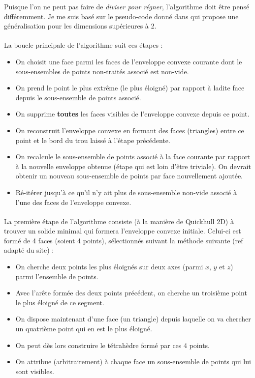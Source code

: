 \documentclass[]{article}
\begin{document}
Puisque l'on ne peut pas faire de \emph{diviser pour régner}, l'algorithme doit être pensé différemment. Je me suis basé sur le pseudo-code donné dans \cite{10.1145/235815.235821} qui propose une généralisation pour les dimensions supérieures à 2.

\paragraph{}
La boucle principale de l'algorithme suit ces étapes :
\begin{itemize}
	\item On choisit une face parmi les faces de l'enveloppe convexe courante dont le sous-ensembles de points non-traités associé est non-vide.
	\item On prend le point le plus extrême (le plus éloigné) par rapport à ladite face depuis le sous-ensemble de points associé.
	\item On supprime \textbf{toutes} les faces visibles de l'enveloppe convexe depuis ce point.
	\item On reconstruit l'enveloppe convexe en formant des faces (triangles) entre ce point et le bord du trou laissé à l'étape précédente.
	\item On recalcule le sous-ensemble de points associé à la face courante par rapport à la nouvelle enveloppe obtenue (étape qui est loin d'être triviale). On devrait obtenir un nouveau sous-ensemble de points par face nouvellement ajoutée.
	\item Ré-itérer jusqu'à ce qu'il n'y ait plus de sous-ensemble non-vide associé à l'une des faces de l'enveloppe convexe.
\end{itemize}

\paragraph{}
La première étape de l'algorithme consiste (à la manière de Quickhull 2D) à trouver un solide minimal qui formera l'enveloppe convexe initiale. Celui-ci est formé de 4 faces (soient 4 points), sélectionnés suivant la méthode suivante (ref adapté du site) :
\begin{itemize}
	\item On cherche deux points les plus éloignés sur deux axes (parmi $x$, $y$ et $z$) parmi l'ensemble de points.
	\item Avec l'arête formée des deux points précédent, on cherche un troisième point le plus éloigné de ce segment.
	\item On dispose maintenant d'une face (un triangle) depuis laquelle on va chercher un quatrième point qui en est le plus éloigné.
	\item On peut dès lors construire le tétrahèdre formé par ces 4 points.
	\item On attribue (arbitrairement) à chaque face un sous-ensemble de points qui lui sont visibles.
\end{itemize}
\end{document}
